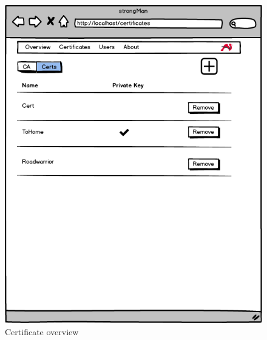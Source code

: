 \begin{figure}[H]
	\centering
	\includegraphics[width=400pt]{images/mockups/cert_overview1.png}
	\caption{Certificate overview}
\end{figure}

